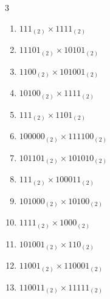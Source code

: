 \begin{multicols}{3}
\begin{enumerate}
  \item $111_{(2)} \times 1111_{(2)}$


  \item $11101_{(2)} \times 10101_{(2)}$


  \item $1100_{(2)} \times 101001_{(2)}$


  \item $10100_{(2)} \times 1111_{(2)}$


\columnbreak %

\resetques

  \item $111_{(2)} \times 1101_{(2)}$


  \item $100000_{(2)} \times 111100_{(2)}$


  \item $101101_{(2)} \times 101010_{(2)}$


  \item $111_{(2)} \times 100011_{(2)}$


  \item $101000_{(2)} \times 10100_{(2)}$


\columnbreak %

  \item $1111_{(2)} \times 1000_{(2)}$


  \item $101001_{(2)} \times 110_{(2)}$


  \item $11001_{(2)} \times 110001_{(2)}$


  \item $110011_{(2)} \times 11111_{(2)}$


\end{enumerate}
\end{multicols}
